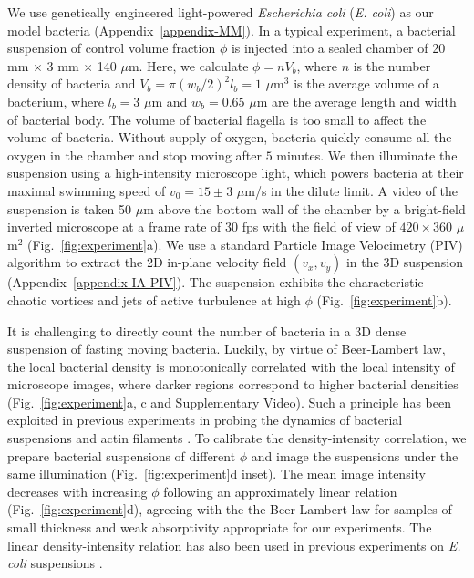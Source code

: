 \documentclass[twocolumn,aps,prx,amsmath,amssymb,longbibliography]{revtex4-2}
\begin{document}
We use genetically engineered light-powered \textit{Escherichia coli} (\textit{E. coli}) as our model bacteria (Appendix~\ref{appendix-MM}).
In a typical experiment, a bacterial suspension of control volume fraction $\phi$ is injected into a sealed chamber of 20 mm $\times$ 3 mm $\times$ 140 $\mu$m. Here, we calculate $\phi = n V_b$, where $n$ is the number density of bacteria and $V_b = \pi (w_b/2)^2 l_b = 1$ $\mu$m$^3$ is the average volume of a bacterium, where $l_b = 3$ $\mu$m and $w_b = 0.65$ $\mu$m are the average length and width of bacterial body. The volume of bacterial flagella is too small to affect the volume of bacteria.
Without supply of oxygen, bacteria quickly consume all the oxygen in the chamber and stop moving after $5$ minutes.
We then illuminate the suspension using a high-intensity microscope light, which powers bacteria at their maximal swimming speed of $v_0 = 15 \pm 3$ $\mu$m/s in the dilute limit.
A video of the suspension is taken 50 $\mu$m above the bottom wall of the chamber by a bright-field inverted microscope at a frame rate of $30$ fps with the field of view of $420 \times 360$ $\mu$m$^2$ (Fig.~\ref{fig:experiment}a).
We use a standard Particle Image Velocimetry (PIV) algorithm
to extract the 2D in-plane velocity field $(v_x,v_y)$ in the 3D suspension (Appendix~\ref{appendix-IA-PIV}). The suspension exhibits the characteristic chaotic vortices and jets of active turbulence at high $\phi$ (Fig.~\ref{fig:experiment}b).

It is challenging to directly count the number of bacteria in a 3D dense suspension of fasting moving bacteria. Luckily, by virtue of Beer-Lambert law, the local bacterial density is monotonically correlated with the local intensity of microscope images, where darker regions correspond to higher bacterial densities (Fig.~\ref{fig:experiment}a, c and Supplementary Video). Such a principle has been exploited in previous experiments in probing the dynamics of bacterial suspensions and actin filaments \cite{Sokolov2009, Wilson2011, Schaller2013}. To calibrate the density-intensity correlation, we prepare bacterial suspensions of different $\phi$ and image the suspensions under the same illumination (Fig.~\ref{fig:experiment}d inset). The mean image intensity decreases with increasing $\phi$ following an approximately linear relation (Fig.~\ref{fig:experiment}d), agreeing with the the Beer-Lambert law for samples of small thickness and weak absorptivity appropriate for our experiments. The linear density-intensity relation has also been used in previous experiments on \textit{E. coli} suspensions \cite{Wilson2011}.
\end{document}
